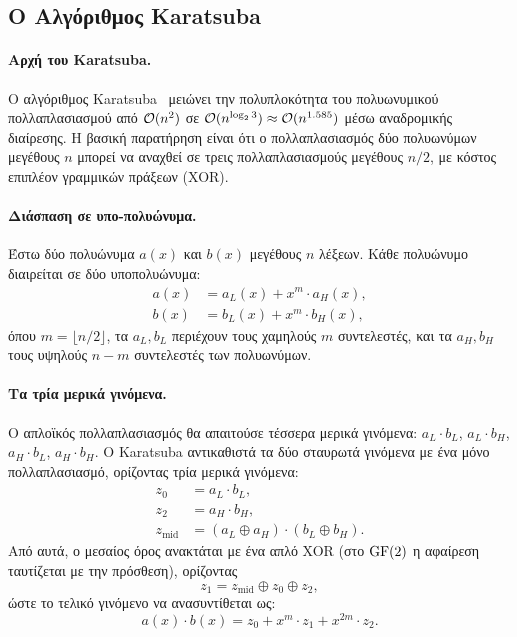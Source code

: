 \subsection{Ο Αλγόριθμος Karatsuba}
\label{sec:karatsuba-algorithm}
{%
\setlength{\abovedisplayskip}{5pt plus 1pt minus 1pt}%
\setlength{\belowdisplayskip}{5pt plus 1pt minus 1pt}%
\setlength{\abovedisplayshortskip}{2pt plus 1pt}%
\setlength{\belowdisplayshortskip}{2pt plus 1pt}%

\paragraph{Αρχή του Karatsuba.}
Ο αλγόριθμος Karatsuba~\cite{Karatsuba1962} μειώνει την πολυπλοκότητα του
πολυωνυμικού πολλαπλασιασμού από $\mathcal{O}(n^2)$ σε $\mathcal{O}(n^{\log_2 3}) \approx
\mathcal{O}(n^{1.585})$ μέσω αναδρομικής διαίρεσης.
Η βασική παρατήρηση είναι ότι ο πολλαπλασιασμός δύο πολυωνύμων μεγέθους $n$
μπορεί να αναχθεί σε τρεις πολλαπλασιασμούς μεγέθους $n/2$,
με κόστος επιπλέον γραμμικών πράξεων (XOR).

\paragraph{Διάσπαση σε υπο-πολυώνυμα.}
Έστω δύο πολυώνυμα $a(x)$ και $b(x)$ μεγέθους $n$ λέξεων.
Κάθε πολυώνυμο διαιρείται σε δύο υποπολυώνυμα:
\begin{align}
  a(x) &= a_L(x) + x^m \cdot a_H(x), \\
  b(x) &= b_L(x) + x^m \cdot b_H(x),
\end{align}
όπου $m = \lfloor n/2 \rfloor$, τα $a_L, b_L$ περιέχουν τους χαμηλούς $m$
συντελεστές, και τα $a_H, b_H$ τους υψηλούς $n - m$ συντελεστές των πολυωνύμων.

\paragraph{Τα τρία μερικά γινόμενα.}
Ο απλοϊκός πολλαπλασιασμός θα απαιτούσε τέσσερα μερικά γινόμενα:
$a_L \cdot b_L$, $a_L \cdot b_H$, $a_H \cdot b_L$, $a_H \cdot b_H$.
Ο Karatsuba αντικαθιστά τα δύο σταυρωτά γινόμενα με ένα μόνο πολλαπλασιασμό,
ορίζοντας τρία μερικά γινόμενα:
\begin{align}
  z_0   &= a_L \cdot b_L, \\
  z_2   &= a_H \cdot b_H, \\
  z_{\text{mid}} &= (a_L \oplus a_H) \cdot (b_L \oplus b_H).
\end{align}
Από αυτά, ο μεσαίος όρος ανακτάται με ένα απλό XOR (στο $\mathrm{GF}(2)$ η αφαίρεση ταυτίζεται με την πρόσθεση), ορίζοντας
\begin{equation}
  z_1 = z_{\text{mid}} \oplus z_0 \oplus z_2,
\end{equation}
ώστε το τελικό γινόμενο να ανασυντίθεται ως:
\begin{equation}
  a(x) \cdot b(x) = z_0 + x^m \cdot z_1 + x^{2m} \cdot z_2.
\end{equation}

}
